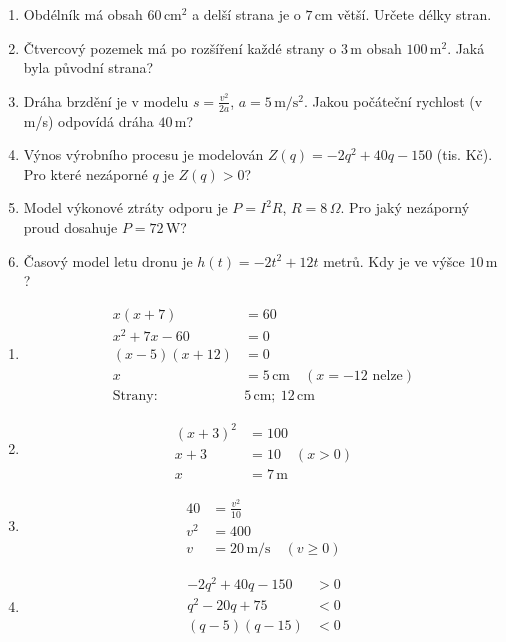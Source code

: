 \documentclass[11pt,a4paper]{article}
\begin{document}
\begin{zadaniReseniBox}[title={Domácí úkol}]
\begin{enumerate}[label=\alph*),itemsep=2pt]
\item Obdélník má obsah $60\,\mathrm{cm^2}$ a delší strana je o $7\,\mathrm{cm}$ větší. Určete délky stran.
\item Čtvercový pozemek má po rozšíření každé strany o $3\,\mathrm m$ obsah $100\,\mathrm{m^2}$. Jaká byla původní strana?
\item Dráha brzdění je v modelu $s=\frac{v^2}{2a}$, $a=5\,\mathrm{m/s^2}$. Jakou počáteční rychlost (v m/s) odpovídá dráha $40\,\mathrm m$?
\item Výnos výrobního procesu je modelován $Z(q)=-2q^2+40q-150$ (tis. Kč). Pro které nezáporné $q$ je $Z(q)>0$?
\item Model výkonové ztráty odporu je $P=I^2R$, $R=8\,\Omega$. Pro jaký nezáporný proud dosahuje $P=72\,\mathrm W$?
\item Časový model letu dronu je $h(t)=-2t^2+12t$ metrů. Kdy je ve výšce $10\,\mathrm m$?
\end{enumerate}
\tcblower
\begin{enumerate}[label=\alph*),itemsep=2pt]
\item
\[\begin{aligned}
x(x+7)&=60\\[2pt]
x^2+7x-60&=0\\[2pt]
(x-5)(x+12)&=0\\[2pt]
x&=5\,\mathrm{cm}\quad (x=-12\text{ nelze})\\[2pt]
\text{Strany: }&5\,\mathrm{cm};\ 12\,\mathrm{cm}
\end{aligned}\]
\item
\[\begin{aligned}
(x+3)^2&=100\\[2pt]
x+3&=10\quad (x>0)\\[2pt]
x&=7\,\mathrm m
\end{aligned}\]
\item
\[\begin{aligned}
40&=\frac{v^2}{10}\\[2pt]
v^2&=400\\[2pt]
v&=20\,\mathrm{m/s}\quad(v\ge0)
\end{aligned}\]
\item
\[\begin{aligned}
-2q^2+40q-150&>0\\[2pt]
q^2-20q+75&<0\\[2pt]
(q-5)(q-15)&<0\\[2pt]

\end{aligned}\]
\end{enumerate}
\end{zadaniReseniBox}
\end{document}
